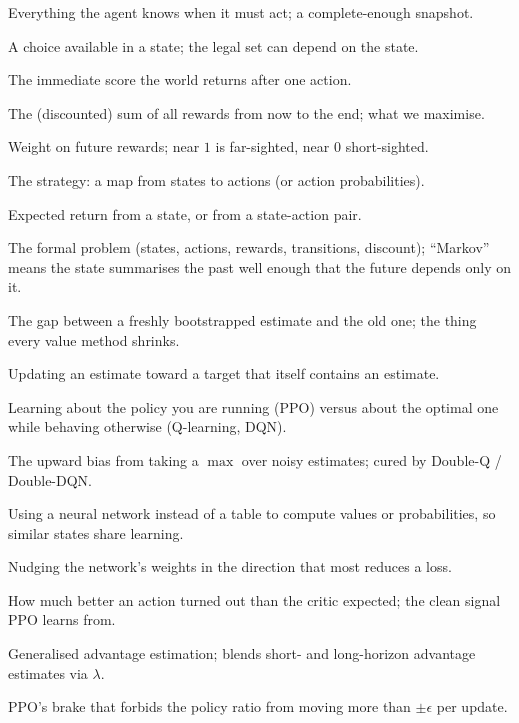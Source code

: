 \documentclass[11pt]{article}
\begin{document}
\begin{description}[leftmargin=0pt,itemsep=2pt,style=nextline]
\item[State $s$] Everything the agent knows when it must act; a complete-enough snapshot.
\item[Action $a$] A choice available in a state; the legal set can depend on the state.
\item[Reward $r$] The immediate score the world returns after one action.
\item[Return $G$] The (discounted) sum of all rewards from now to the end; what we maximise.
\item[Discount $\gamma$] Weight on future rewards; near $1$ is far-sighted, near $0$ short-sighted.
\item[Policy $\pi$] The strategy: a map from states to actions (or action probabilities).
\item[Value $V(s)$, $Q(s,a)$] Expected return from a state, or from a state-action pair.
\item[MDP / Markov] The formal problem (states, actions, rewards, transitions, discount); ``Markov'' means the state summarises the past well enough that the future depends only on it.
\item[TD error] The gap between a freshly bootstrapped estimate and the old one; the thing every value method shrinks.
\item[Bootstrapping] Updating an estimate toward a target that itself contains an estimate.
\item[On-policy / off-policy] Learning about the policy you are running (PPO) versus about the optimal one while behaving otherwise (Q-learning, DQN).
\item[Overestimation] The upward bias from taking a $\max$ over noisy estimates; cured by Double-Q / Double-DQN.
\item[Function approximation] Using a neural network instead of a table to compute values or probabilities, so similar states share learning.
\item[Gradient descent] Nudging the network's weights in the direction that most reduces a loss.
\item[Advantage $\hat A_t$] How much better an action turned out than the critic expected; the clean signal PPO learns from.
\item[GAE] Generalised advantage estimation; blends short- and long-horizon advantage estimates via $\lambda$.
\item[Clipping] PPO's brake that forbids the policy ratio from moving more than $\pm\epsilon$ per update.

\end{description}
\end{document}
